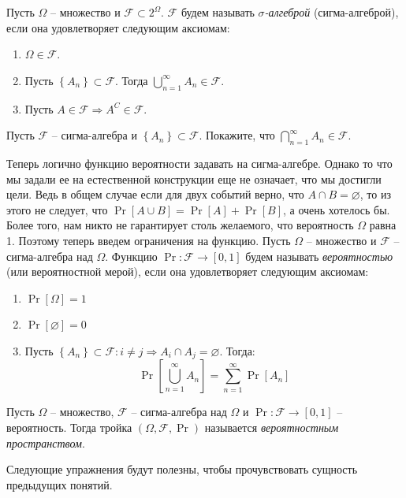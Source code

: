 \Def Пусть $\Omega$ -- множество и $\mathcal{F} \subset 2^\Omega$. $\mathcal{F}$ будем называть \textit{$\sigma$-алгеброй} (сигма-алгеброй), если она удовлетворяет следующим аксиомам:
\begin{enumerate}
    \item $\Omega \in \mathcal{F}$.
    \item Пусть $\left\{ A_n \right\} \subset \mathcal{F}$. Тогда $\bigcup\limits_{n = 1}^\infty A_n \in \mathcal{F}$.
    \item Пусть $A \in \mathcal{F} \Rightarrow A^C \in \mathcal{F}$.
\end{enumerate}

\Exe Пусть $\mathcal{F}$ -- сигма-алгебра и $\left\{ A_n \right\} \subset \mathcal{F}$. Покажите, что $\bigcap\limits_{n = 1}^\infty A_n \in \mathcal{F}$.

Теперь логично функцию вероятности задавать на сигма-алгебре. Однако то что мы задали ее на естественной конструкции еще не означает, что мы достигли цели. Ведь в общем случае если для двух событий верно, что $A \cap B = \varnothing$, то из этого не следует, что $\Pr[A \cup B] = \Pr[A] + \Pr[B]$, а очень хотелось бы.
Более того, нам никто не гарантирует столь желаемого, что вероятность $\Omega$ равна 1.
Поэтому теперь введем ограничения на функцию.
\Def Пусть $\Omega$ -- множество и $\mathcal{F}$ -- сигма-алгебра над $\Omega$. Функцию $\Pr: \mathcal{F} \to [0, 1]$ будем называть \textit{вероятностью} (или вероятностной мерой), если она удовлетворяет следующим аксиомам:
\begin{enumerate}
    \item $\Pr[\Omega] = 1$
    \item $\Pr[\varnothing] = 0$
    \item Пусть $\left\{ A_n \right\} \subset \mathcal{F}: i \neq j \Rightarrow A_i \cap A_j = \varnothing$. Тогда:
    \begin{equation*}
        \Pr\left[ \bigcup\limits_{n = 1}^\infty A_n \right] = \sum\limits_{n = 1}^\infty \Pr [A_n]
    \end{equation*}
\end{enumerate}

\Def Пусть $\Omega$ -- множество, $\mathcal{F}$ -- сигма-алгебра над $\Omega$ и $\Pr: \mathcal{F} \to [0, 1]$ -- вероятность. Тогда тройка $(\Omega, \mathcal{F}, \Pr)$ называется \textit{вероятностным пространством}.

Следующие упражнения будут полезны, чтобы прочувствовать сущность предыдущих понятий.

